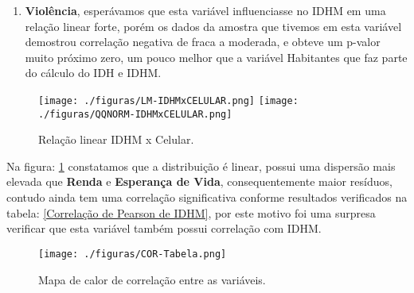 \documentclass[journal]{IEEEtran}
\begin{document}
\begin{enumerate}
\item {\textbf{Violência}, esperávamos que esta variável influenciasse no IDHM em uma relação linear forte, porém os dados da amostra que tivemos em \cite{Atlas2017} esta variável demostrou correlação negativa de fraca a moderada, e obteve um p-valor muito próximo zero, um pouco melhor que a variável Habitantes que faz parte do cálculo do IDH e IDHM\cite{Luciana2007}.}
\end{enumerate}





\begin{figure}[H]
\center
{\texttt{[image: ./figuras/LM-IDHMxCELULAR.png]} \quad
\texttt{[image: ./figuras/QQNORM-IDHMxCELULAR.png]}}
\caption{Relação linear IDHM x Celular.}
\label{LM-IDHMxCELULAR}
\end{figure}

Na figura: \ref{LM-IDHMxCELULAR} constatamos que a distribuição é linear, possui uma dispersão mais elevada que \textbf{Renda} e \textbf{Esperança de Vida}, consequentemente maior resíduos, contudo ainda tem uma correlação significativa conforme resultados verificados na tabela: \ref{Correlação de Pearson de IDHM}, por este motivo foi uma surpresa verificar que esta variável também possui correlação com IDHM.

\begin{figure}[H]
\center
{\texttt{[image: ./figuras/COR-Tabela.png]}}
\caption{Mapa de calor de correlação entre as variáveis.}
\label{COR-Tabela}
\end{figure}
\end{document}
